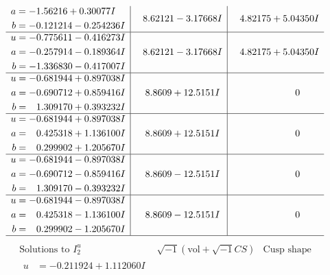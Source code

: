 \documentclass[1p]{elsarticle_modified}
\theoremstyle{definition}
\newcommand{\I}{\sqrt{-1}}
\begin{document}
$$\begin{array}{c|c|c}
\begin{aligned}
a &= -1.56216 + 0.30077 I \\
b &= -0.121214 - 0.254236 I\end{aligned}
 & \phantom{-}8.62121 - 3.17668 I & \phantom{-}4.82175 + 5.04350 I \\ \hline\begin{aligned}
u &= -0.775611 - 0.416273 I \\
a &= -0.257914 - 0.189364 I \\
b &= -1.336830 - 0.417007 I\end{aligned}
 & \phantom{-}8.62121 - 3.17668 I & \phantom{-}4.82175 + 5.04350 I \\ \hline\begin{aligned}
u &= -0.681944 + 0.897038 I \\
a &= -0.690712 + 0.859416 I \\
b &= \phantom{-}1.309170 + 0.393232 I\end{aligned}
 & \phantom{-}8.8609 + 12.5151 I & \phantom{-0.000000 } 0 \\ \hline\begin{aligned}
u &= -0.681944 + 0.897038 I \\
a &= \phantom{-}0.425318 + 1.136100 I \\
b &= \phantom{-}0.299902 + 1.205670 I\end{aligned}
 & \phantom{-}8.8609 + 12.5151 I & \phantom{-0.000000 } 0 \\ \hline\begin{aligned}
u &= -0.681944 - 0.897038 I \\
a &= -0.690712 - 0.859416 I \\
b &= \phantom{-}1.309170 - 0.393232 I\end{aligned}
 & \phantom{-}8.8609 - 12.5151 I & \phantom{-0.000000 } 0 \\ \hline\begin{aligned}
u &= -0.681944 - 0.897038 I \\
a &= \phantom{-}0.425318 - 1.136100 I \\
b &= \phantom{-}0.299902 - 1.205670 I\end{aligned}
 & \phantom{-}8.8609 - 12.5151 I & \phantom{-0.000000 } 0\\
 \hline 
 \end{array}$$\newpage$$\begin{array}{c|c|c}  
\text{Solutions to }I^u_{2}& \I (\text{vol} + \sqrt{-1}CS) & \text{Cusp shape}\\
 \hline 
\begin{aligned}
u &= -0.211924 + 1.112060 I \\

\end{aligned}
\end{array}$$
\end{document}
